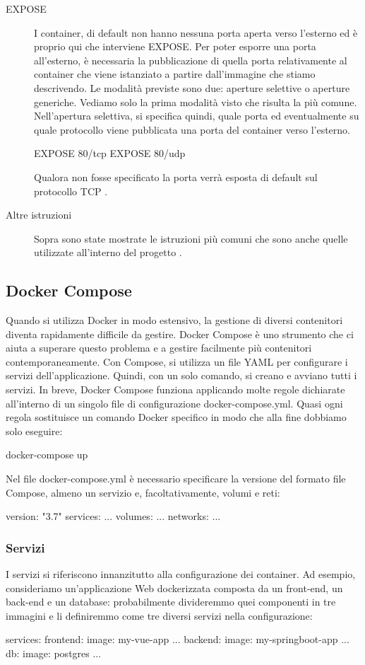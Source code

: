 \begin{description}
 \item [EXPOSE] I container, di default non hanno nessuna porta aperta verso l’esterno ed è proprio qui che interviene EXPOSE. Per poter esporre una porta all’esterno, è necessaria la pubblicazione di quella porta relativamente al container che viene istanziato a partire dall’immagine che stiamo descrivendo. Le modalità previste sono due: aperture selettive o aperture generiche. Vediamo solo la prima modalità visto che risulta la più comune. Nell'apertura selettiva, si specifica quindi, quale porta ed eventualmente su quale protocollo viene pubblicata una porta del container verso l’esterno.
 \begin{pythoncode}
 EXPOSE 80/tcp
 EXPOSE 80/udp
 \end{pythoncode}
 Qualora non fosse specificato la porta verrà esposta di default sul protocollo TCP \cite{dockerfile}.
 \item [Altre istruzioni] Sopra sono state mostrate le istruzioni più comuni che sono anche quelle utilizzate all'interno del progetto \cite{dockerbuilder}.
\end{description} 

\subsection{Docker Compose}
Quando si utilizza Docker in modo estensivo, la gestione di diversi contenitori diventa rapidamente difficile da gestire. Docker Compose è uno strumento che ci aiuta a superare questo problema e a gestire facilmente più contenitori contemporaneamente. Con Compose, si utilizza un file YAML per configurare i servizi dell'applicazione. Quindi, con un solo comando, si creano e avviano tutti i servizi. In breve, Docker Compose funziona applicando molte regole dichiarate all'interno di un singolo file di configurazione docker-compose.yml. Quasi ogni regola sostituisce un comando Docker specifico in modo che alla fine dobbiamo solo eseguire:
\begin{pythoncode}
docker-compose up
\end{pythoncode}
Nel file docker-compose.yml è necessario specificare la versione del formato file Compose, almeno un servizio e, facoltativamente, volumi e reti:
\begin{pythoncode}
version: "3.7"
services:
  ...
volumes:
  ...
networks:
  ...
\end{pythoncode}

\subsubsection{Servizi}
I servizi si riferiscono innanzitutto alla configurazione dei container. Ad esempio, consideriamo un'applicazione Web dockerizzata composta da un front-end, un back-end e un database: probabilmente divideremmo quei componenti in tre immagini e li definiremmo come tre diversi servizi nella configurazione:
\begin{pythoncode}
services:
  frontend:
    image: my-vue-app
    ...
  backend:
    image: my-springboot-app
    ...
  db:
    image: postgres
    ...
\end{pythoncode}

